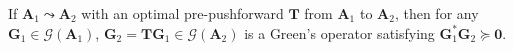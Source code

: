 \documentclass[noinfoline]{imsart}\setcounter{tocdepth}{2}
\renewcommand{\b}[1]{\mathbb{#1}} %
\newcommand{\m}[1]{\mathbf{#1}} %
\renewcommand{\c}[1]{\mathcal{#1}} %
\newcommand{\vertii}[1]{{\vert\kern-0.25ex\vert\kern-0.25ex\vert #1 
    \vert\kern-0.25ex\vert\kern-0.25ex\vert}} %
\theoremstyle{plain}
\newtheorem{proposition}[theorem]{Proposition}
\begin{document}
If $\m{A}_{1} \leadsto \m{A}_{2}$ with an optimal pre-pushforward $\m{T}$ from $\m{A}_{1}$ to $\m{A}_{2}$, then for any $\m{G}_{1} \in \c{G}(\m{A}_{1})$, $\m{G}_{2} = \m{T} \m{G}_{1} \in \c{G}(\m{A}_{2})$ is a Green's operator satisfying $\m{G}_{1}^{*} \m{G}_{2} \succeq \m{0}$.



\end{document}
